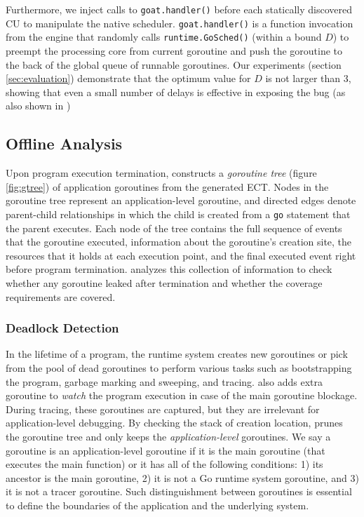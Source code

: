 Furthermore, we inject calls to \texttt{goat.handler()} before each statically discovered CU to manipulate the native scheduler. \texttt{goat.handler()} is a function invocation from the \goat engine that randomly calls \texttt{runtime.GoSched()} (within a bound $D$) to preempt the processing core from current goroutine and push the goroutine to the back of the global queue of runnable goroutines.
%
Our experiments (section \ref{sec:evaluation}) demonstrate that the optimum value for $D$ is not larger than 3, showing that even a small number of delays is effective in exposing the bug (as also shown in \cite{burckhardt-depthBug-asplos10})

\subsection{Offline Analysis}
\label{sec:offline_analysis}
Upon program execution termination, \goat constructs a \textit{goroutine tree} (figure \ref{fig:gtree}) of application goroutines from the generated ECT.
%
Nodes in the goroutine tree represent an application-level goroutine, and directed edges denote parent-child relationships in which the child is created from a \texttt{go} statement that the parent executes.
%
Each node of the tree contains the full sequence of events that the goroutine executed, information about the goroutine's creation site, the resources that it holds at each execution point, and the final executed event right before program termination.
%
\goat analyzes this collection of information to check whether any goroutine leaked after termination and whether the coverage requirements are covered.

\subsubsection{Deadlock Detection}
In the lifetime of a program, the runtime system creates new goroutines or pick from the pool of dead goroutines to perform various tasks such as bootstrapping the program, garbage marking and sweeping, and tracing.
%
\goat also adds extra goroutine to \textit{watch} the program execution in case of the main goroutine blockage.
%
During tracing, these goroutines are captured, but they are irrelevant for application-level debugging.
%
By checking the stack of creation location, \goat prunes the goroutine tree and only keeps the \textit{application-level} goroutines.
%
We say a goroutine is an application-level goroutine if it is the main goroutine (that executes the main function) or it has all of the following conditions:
1) its ancestor is the main goroutine,
2) it is not a Go runtime system goroutine, and
3) it is not a tracer goroutine.
Such distinguishment between goroutines is essential to define the boundaries of the application and the underlying system.

